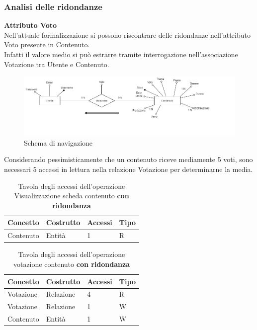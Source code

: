 \documentclass[a4paper]{article}
\begin{document}
\subsubsection{Analisi delle ridondanze}
\textbf{Attributo Voto}\\
Nell'attuale formalizzazione si possono riscontrare delle ridondanze nell'attributo Voto presente
in Contenuto. \\
Infatti il valore medio si può estrarre tramite interrogazione nell'associazione Votazione tra Utente 
e Contenuto. 
\begin{center}
\begin{figure}[h]
  \includegraphics[width=1.2\textwidth]{Coming-soon-er-Sliced.png}
  \caption{Schema di navigazione}
\end{figure}
\end{center}

Considerando pessimisticamente che un contenuto riceve mediamente 5 voti, sono necessari 5 accessi in lettura 
nella relazione Votazione per determinarne la media. 

\begin{table}[H]
\begin{tabular}{ | l | l | l | l | }
\hline
\textbf{Concetto} & \textbf{Costrutto} & \textbf{Accessi} & \textbf{Tipo} \\
\hline
\hline
Contenuto & Entità & 1 & R \\
\hline
\end{tabular}
  \caption{Tavola degli accessi dell'operazione Visualizzazione scheda contenuto \textbf{con ridondanza}}
\end{table}

\begin{table}[H]
\begin{tabular}{ | l | l | l | l | }
\hline
\textbf{Concetto} & \textbf{Costrutto} & \textbf{Accessi} & \textbf{Tipo} \\
\hline
\hline
Votazione & Relazione & 4 & R \\
Votazione & Relazione & 1 & W \\
Contenuto & Entità & 1 & W \\
\hline
\end{tabular}
  \caption{Tavola degli accessi dell'operazione votazione contenuto \textbf{con ridondanza}}
\end{table}
\end{document}
